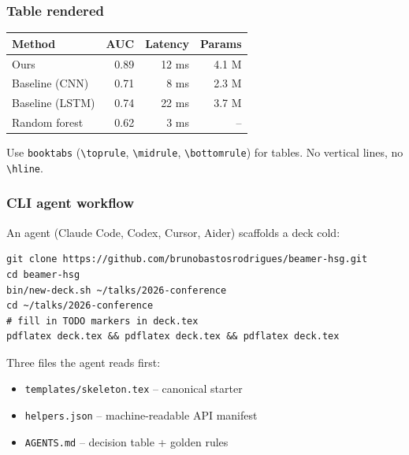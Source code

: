 \documentclass[aspectratio=169]{beamer}
\begin{document}
\begin{frame}[t]
  \frametitle{Table rendered}

  \vspace{0.6em}
  \begin{center}
  \begin{tabular}{@{}lrrr@{}}
    \toprule
    \textbf{Method} & \textbf{AUC} & \textbf{Latency} & \textbf{Params} \\
    \midrule
    Ours              & 0.89 & 12 ms &  4.1 M \\
    Baseline (CNN)    & 0.71 &  8 ms &  2.3 M \\
    Baseline (LSTM)   & 0.74 & 22 ms &  3.7 M \\
    Random forest     & 0.62 &  3 ms &  --    \\
    \bottomrule
  \end{tabular}
  \end{center}

  \vspace{0.6em}
  \footnotesize Use \texttt{booktabs} (\texttt{\textbackslash toprule},
  \texttt{\textbackslash midrule}, \texttt{\textbackslash bottomrule})
  for tables. No vertical lines, no \texttt{\textbackslash hline}.
\end{frame}


\begin{frame}[t,fragile]
  \frametitle{CLI agent workflow}

  An agent (Claude Code, Codex, Cursor, Aider) scaffolds a deck cold:

  \begin{lstlisting}
git clone https://github.com/brunobastosrodrigues/beamer-hsg.git
cd beamer-hsg
bin/new-deck.sh ~/talks/2026-conference
cd ~/talks/2026-conference
# fill in TODO markers in deck.tex
pdflatex deck.tex && pdflatex deck.tex && pdflatex deck.tex
  \end{lstlisting}

  \vspace{0.4em}
  Three files the agent reads first:
  \begin{itemize}
    \setlength\itemsep{0.2em}
    \item \texttt{templates/skeleton.tex} -- canonical starter
    \item \texttt{helpers.json} -- machine-readable API manifest
    \item \texttt{AGENTS.md} -- decision table + golden rules
  \end{itemize}
\end{frame}
\end{document}
